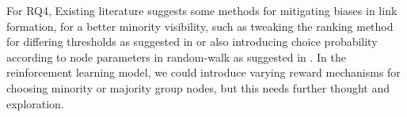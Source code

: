 \bigskip

For RQ4, Existing literature suggests some methods for mitigating biases in link formation, for a better minority visibility, such as tweaking the ranking method for differing thresholds as suggested in \cite{karimi2018homophily} or also introducing choice probability according to node parameters in random-walk as suggested in \cite{stoica2018algorithmic}. In the reinforcement learning model, we could introduce varying reward mechanisms for choosing minority or majority group nodes, but this needs further thought and exploration.